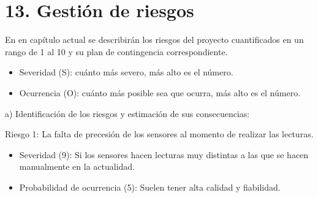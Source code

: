 \documentclass[
11pt, %
]{charter}
\begin{document}

\section{13. Gestión de riesgos}
\label{sec:riesgos}

En en capítulo actual se describirán los riesgos del proyecto cuantificados en un rango de 1 al 10 y su plan de contingencia correspondiente.

\begin{itemize}
	\item Severidad (S): cuánto más severo, más alto es el número.\\

	\item Ocurrencia (O): cuánto más posible sea  que ocurra, más alto es el número.\\
\end{itemize}   

a) Identificación de los riesgos y estimación de sus consecuencias:
 
Riesgo 1: La falta de precesión de los sensores al momento de realizar las lecturas.
\begin{itemize}
	\item Severidad (9): Si los sensores hacen lecturas muy distintas a las que se hacen manualmente en la actualidad.\\
	\item Probabilidad de ocurrencia (5): Suelen tener alta calidad y fiabilidad.\\
\end{itemize}   
\end{document}
